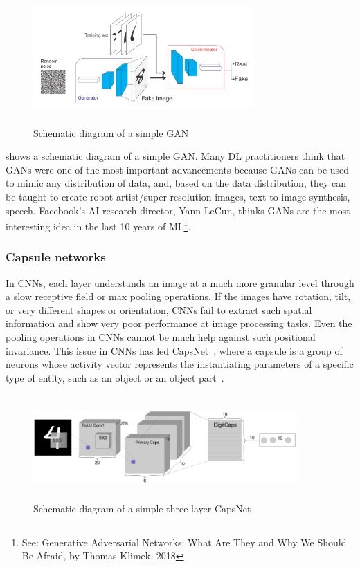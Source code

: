 \vspace{-2mm}
\begin{figure}[h]
    \centering
    \vspace{-3mm}
    \includegraphics[width=0.75\textwidth,height=50mm]{images/gan.png}
    \caption{Schematic diagram of a simple GAN~\cite{karimDLTF2018}}
    \label{fig:gan}
    \vspace{-2mm}
\end{figure}

\hspace*{3.5mm}  shows a schematic diagram of a simple GAN. Many DL practitioners think that GANs were one of the most important advancements because GANs can be used to mimic any distribution of data, and, based on the data distribution, they can be taught to create robot artist/super-resolution images, text to image synthesis, speech. Facebook's AI research director, Yann LeCun, thinks GANs are the most interesting idea in the last 10 years of ML\footnote{See: Generative Adversarial Networks: What Are They and Why We Should Be Afraid, by Thomas Klimek, 2018}.

\subsubsection{Capsule networks}
In CNNs, each layer understands an image at a much more granular level through a slow receptive field or max pooling operations. If the images have rotation, tilt, or very different shapes or orientation, CNNs fail to extract such spatial information and show very poor performance at image processing tasks. Even the pooling operations in CNNs cannot be much help against such positional invariance. This issue in CNNs has led CapsNet~\cite{CapsNet}, where a capsule is a group of neurons whose activity vector represents the instantiating parameters of a specific type of entity, such as an object or an object part~\cite{CapsNet}.

\begin{figure}[h]
    \centering
    \includegraphics[width=0.9\textwidth,height=40mm]{images/capsnet.png}
    \caption{Schematic diagram of a simple three-layer CapsNet~\cite{karimDLTF2018}}
    \label{fig:capsnet}
\end{figure}

